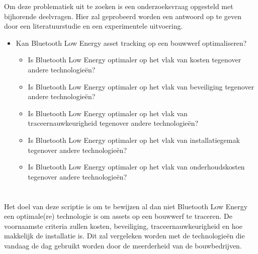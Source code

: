 
Om deze problematiek uit te zoeken is een onderzoeksvraag opgesteld met bijhorende deelvragen. Hier zal geprobeerd worden een antwoord op te geven door een literatuurstudie en een experimentele uitvoering.

\begin{itemize}
    \item Kan Bluetooth Low Energy asset tracking op een bouwwerf optimaliseren?
    \begin{itemize}
        \item Is Bluetooth Low Energy optimaler op het vlak van kosten tegenover andere technologieën?
        \item Is Bluetooth Low Energy optimaler op het vlak van beveiliging tegenover andere technologieën?
        \item Is Bluetooth Low Energy optimaler op het vlak van traceernauwkeurigheid tegenover andere technologieën?
        \item Is Bluetooth Low Energy optimaler op het vlak van installatiegemak tegenover andere technologieën?
        \item Is Bluetooth Low Energy optimaler op het vlak van onderhoudskosten tegenover andere technologieën?
    \end{itemize}
\end{itemize}

\section{}%
\label{sec:onderzoeksdoelstelling}


Het doel van deze scriptie is om te bewijzen al dan niet Bluetooth Low Energy een optimale(re) technologie is om assets op een bouwwerf te traceren. De voornaamste criteria zullen kosten, beveiliging, traceernauwkeurigheid en hoe makkelijk de installatie is. Dit zal vergeleken worden met de technologieën die vandaag de dag gebruikt worden door de meerderheid van de bouwbedrijven.


